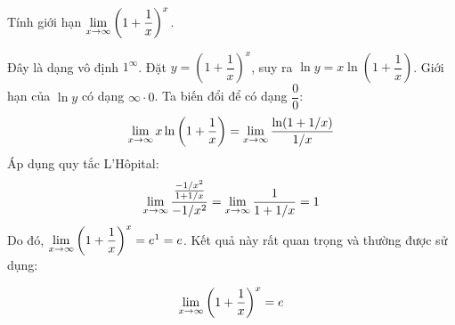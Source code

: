 \begin{example}
Tính giới hạn $\lim\limits_{x \to \infty} \left(1 + \dfrac{1}{x}\right)^x$.
\begin{solution}
Đây là dạng vô định $1^\infty$. Đặt $y = \left(1 + \dfrac{1}{x}\right)^x$, suy ra $\ln y = x \ln\left(1 + \dfrac{1}{x}\right)$.
Giới hạn của $\ln y$ có dạng $\infty \cdot 0$. Ta biến đổi để có dạng $\dfrac{0}{0}$:
$$ \lim\limits_{x \to \infty} x \ln\left(1 + \dfrac{1}{x}\right) = \lim\limits_{x \to \infty} \dfrac{\ln(1 + 1/x)}{1/x} $$
Áp dụng quy tắc L'Hôpital:
$$ \lim\limits_{x \to \infty} \dfrac{\frac{-1/x^2}{1+1/x}}{-1/x^2} = \lim\limits_{x \to \infty} \dfrac{1}{1+1/x} = 1 $$
Do đó, $\lim\limits_{x \to \infty} \left(1 + \dfrac{1}{x}\right)^x = e^1 = e$.
Kết quả này rất quan trọng và thường được sử dụng:
\begin{importantbox}
$$ \lim\limits_{x \to \infty} \left(1 + \dfrac{1}{x}\right)^x = e $$
\end{importantbox}
\end{solution}
\end{example}

